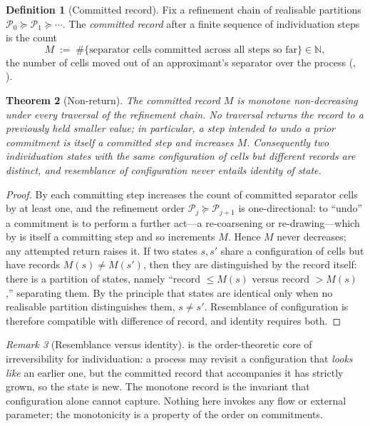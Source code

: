 \documentclass[11pt,a4paper]{article}
\theoremstyle{thmstyle}
\newtheorem{theorem}{Theorem}[section]
\theoremstyle{definition}
\newtheorem{definition}[theorem]{Definition}
\theoremstyle{remark}
\newtheorem{remark}[theorem]{Remark}
\newcommand{\N}{\mathbb{N}}
\newcommand{\Part}{\mathscr{P}}
\begin{document}
\begin{definition}[Committed record]
\label{def:record}
Fix a refinement chain of realisable partitions
$\Part_0\succeq\Part_1\succeq\cdots$. The \emph{committed record} after a finite
sequence of individuation steps is the count
\[
M\;:=\;\#\{\text{separator cells committed across all steps so far}\}\in\N,
\]
the number of cells moved out of an approximant's separator over the process
\textup{(}, \textup{)}.
\end{definition}

\begin{theorem}[Non-return]
\label{thm:nonreturn}
The committed record $M$ is monotone non-decreasing under every traversal of the
refinement chain. No traversal returns the record to a previously held smaller
value; in particular, a step intended to undo a prior commitment is itself a
committed step and increases $M$. Consequently two individuation states with the
same configuration of cells but different records are distinct, and resemblance
of configuration never entails identity of state.
\end{theorem}

\begin{proof}
By  each committing step increases the count of
committed separator cells by at least one, and the refinement order
$\Part_j\succeq\Part_{j+1}$ is one-directional: to ``undo'' a commitment is to
perform a further act---a re-coarsening or re-drawing---which by
 is itself a committing step and so increments $M$. Hence $M$
never decreases; any attempted return raises it. If two states $s,s'$ share a
configuration of cells but have records $M(s)\neq M(s')$, then they are
distinguished by the record itself: there is a partition of states, namely
``record $\le M(s)$ versus record $>M(s)$,'' separating them. By the principle
that states are identical only when no realisable partition distinguishes them,
$s\neq s'$. Resemblance of configuration is therefore compatible with difference
of record, and identity requires both.
\end{proof}

\begin{remark}[Resemblance versus identity]
\label{rem:resemblance}
 is the order-theoretic core of irreversibility for
individuation: a process may revisit a configuration that \emph{looks like} an
earlier one, but the committed record that accompanies it has strictly grown, so
the state is new. The monotone record is the invariant that configuration alone
cannot capture. Nothing here invokes any flow or external parameter; the
monotonicity is a property of the order on commitments.
\end{remark}
\end{document}
